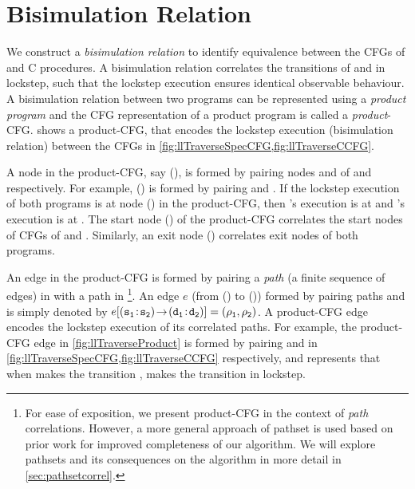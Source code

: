 \section{Bisimulation Relation}
\label{sec:bisim}
We construct a {\em bisimulation relation} to identify equivalence between the CFGs of \SpecL{} and C procedures.
A bisimulation relation correlates the transitions of \sprog{} and \cprog{} in lockstep, such that the
lockstep execution ensures identical observable behaviour.
A bisimulation relation between two programs can be represented using a {\em product program}
\cite{covac} and the CFG representation of a product program is called a {\em product}-CFG.
 shows a product-CFG, that encodes the lockstep execution
(bisimulation relation) between the CFGs in \cref{fig:llTraverseSpecCFG,fig:llTraverseCCFG}.

A node in the product-CFG, say (), is formed by pairing nodes  and  of \sprog{} and \cprog{} respectively.
For example, () is formed by pairing  and .
If the lockstep execution of both programs is at node () in the product-CFG,
then \sprog{}'s execution is at  and \cprog{}'s execution is at .
The start node () of the product-CFG correlates the start nodes of CFGs of \sprog{} and \cprog{}.
Similarly, an exit node () correlates exit nodes of both programs.

An edge in the product-CFG is formed by pairing a {\em path} (a finite sequence of edges) in \sprog{}
with a path in \cprog{}\footnote{
For ease of exposition, we present product-CFG in the context of {\em path} correlations.
However, a more general approach of pathset is used based on prior work \cite{oopsla20}
for improved completeness of our algorithm.
We will explore pathsets and its consequences on the algorithm in more detail in \cref{sec:pathsetcorrel}.}.
An edge $e$ (from () to ()) formed by pairing paths  and  is simply denoted by
$e[{\small ({\tt s_1\!:\!s_2}) \! \rightarrow \! ({\tt d_1\!:\!d_2})}]=({\tt \rho_{1}},{\tt \rho_{2}})$.
A product-CFG edge encodes the lockstep execution of its correlated paths.
For example, the product-CFG edge  in \cref{fig:llTraverseProduct} is formed by pairing
 and  in \cref{fig:llTraverseSpecCFG,fig:llTraverseCCFG} respectively,
and represents that when \sprog{} makes the transition , \cprog{} makes the transition 
in lockstep.

